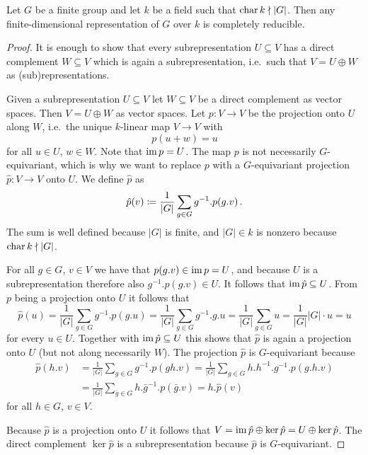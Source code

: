 \begin{theorem}
  \label{theorem: Maschkes theorem}
  Let $G$ be a finite group and let $k$ be a field such that $\operatorname{char} k \nmid |G|$.
  Then any finite-dimensional representation of $G$ over $k$ is completely reducible.
\end{theorem}
\begin{proof}
  It is enough to show that every subrepresentation $U \subseteq V$ has a direct complement $W \subseteq V$ which is again a subrepresentation, i.e.\ such that $V = U \oplus W$ as (sub)representations.
  
  Given a subrepresentation $U \subseteq V$ let $W \subseteq V$ be a direct complement as vector spaces.
  Then $V = U \oplus W$ as vector spaces.
  Let $p \colon V \to V$ be the projection onto $U$ along $W$, i.e.\ the unique $k$-linear map $V \to V$ with
  \[
      p(u + w)
    = u
  \]
  for all $u \in U$, $w \in W$.
  Note that $\operatorname{im} p = U$.
  The map $p$ is not necessarily $G$-equivariant, which is why we want to replace $p$ with a $G$-equivariant projection $\hat{p} \colon V \to V$ onto $U$.
  We define $\hat{p}$ as
  \[
              \hat{p}(v)
    \coloneqq  \frac{1}{|G|} \sum_{g \in G} g^{-1}.p(g.v) \,.
  \]
  The sum is well defined because $|G|$ is finite, and $|G| \in k$ is nonzero because $\operatorname{char} k \nmid |G|$.
  
  For all $g \in G$, $v \in V$ we have that $p(g.v) \in \operatorname{im} p = U$, and because $U$ is a subrepresentation therefore also $g^{-1}.p(g.v) \in U$.
  It follows that $\operatorname{im} \hat{p} \subseteq U$.
  From $p$ being a projection onto $U$ it follows that
  \[
      \hat{p}(u)
    = \frac{1}{|G|} \sum_{g \in G} g^{-1}.p(g.u)
    = \frac{1}{|G|} \sum_{g \in G} g^{-1}.g.u
    = \frac{1}{|G|} \sum_{g \in G} u
    = \frac{1}{|G|} |G| \cdot u
    = u
  \]
  for every $u \in U$.
  Together with $\operatorname{im} \hat{p} \subseteq U$ this shows that $\hat{p}$ is again a projection onto $U$ (but not along necessarily $W$).
  The projection $\hat{p}$ is $G$-equivariant because 
  \begin{align*}
        \hat{p}(h.v)
    &=  \frac{1}{|G|} \sum_{g \in G} g^{-1}.p(gh.v)
     =  \frac{1}{|G|} \sum_{g \in G} h.h^{-1}.g^{-1}.p(g.h.v) \\
    &=  \frac{1}{|G|} \sum_{\bar{g} \in G} h.\bar{g}^{-1}.p(\bar{g}.v)
     =  h.\hat{p}(v)
  \end{align*}
  for all $h \in G$, $v \in V$.
  
  Because $\hat{p}$ is a projection onto $U$ it follows that $V = \operatorname{im} \hat{p} \oplus \ker \hat{p} = U \oplus \ker \hat{p}$.
  The direct complement $\ker \hat{p}$ is a subrepresentation because $\hat{p}$ is $G$-equivariant.
\end{proof}



